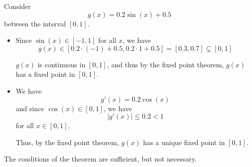 \begin{example}
    Consider \[
        g(x) = 0.2 \sin(x) + 0.5
    \] between the interval \( [0, 1] \).

    \begin{figure}[H]
        \centering
    \end{figure}

    \begin{itemize}
        \item Since \( \sin(x) \in [-1, 1] \) for all \( x \), we have \[
                  g(x) \in [0.2 \cdot (-1) + 0.5, 0.2 \cdot 1 + 0.5] = [0.3, 0.7] \subsetneq [0, 1]
              \]

              \( g(x) \) is continuous in \( [0, 1] \), and thus by the fixed point theorem, \( g(x) \) has a fixed point in \( [0, 1] \).

        \item We have \[
                  g'(x) = 0.2 \cos(x)
              \] and since \( \cos(x) \in [0, 1] \), we have \[
                  | g'(x) | \leq 0.2 < 1
              \] for all \( x \in [0, 1] \).

              Thus, by the fixed point theorem, \( g(x) \) has a unique fixed point in \( [0, 1] \).
    \end{itemize}
\end{example}

\begin{remark}
    The conditions of the theorem are sufficient, but not necessary.
\end{remark}

